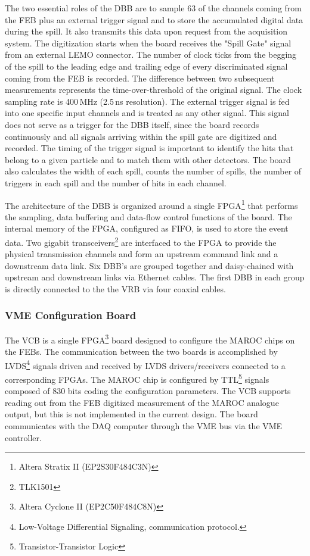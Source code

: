 \documentclass[a4paper,11pt]{article}
\begin{document}
The two essential roles of the DBB are to sample 63 of the channels coming from the FEB plus an external trigger signal and to store the accumulated
digital data during the spill. It also transmits this data upon request from the acquisition system. The digitization starts when the board
receives the "Spill Gate" signal from an external LEMO connector. The number of clock ticks from the begging of the spill to the leading edge
and trailing edge of every discriminated signal coming from the FEB is recorded. The difference between two subsequent measurements represents the time-over-threshold of the original signal. 
The clock sampling rate is 400\,MHz (2.5\,ns resolution). The external trigger signal is fed into one specific
input channels and is treated as any other signal. This signal does not serve as a trigger for the DBB itself, since the board records continuously
and all signals arriving within the spill gate are digitized and recorded. The timing of the trigger signal is important
to identify the hits that belong to a given particle and to match them with other detectors. The board also
calculates the width of each spill, counts the number of spills, the number of triggers in each spill and the number of hits in each channel.

The architecture of the DBB is organized around a single FPGA\footnote{Altera Stratix II (EP2S30F484C3N)} that performs the sampling, data
buffering and data-flow control functions of the board. The internal memory of the FPGA, configured as FIFO, is used to store the event data. Two gigabit transceivers\footnote{TLK1501}
are interfaced to the FPGA to provide the physical transmission channels and form an upstream command link and a downstream data link. Six DBB's are
grouped together and daisy-chained with upstream and downstream links via Ethernet cables. The first DBB in each group is directly connected to the
the VRB via four coaxial cables.

\subsubsection{VME Configuration Board}
The VCB is a single FPGA\footnote{Altera Cyclone II (EP2C50F484C8N)} board designed to configure the MAROC chips on the FEBs. The
communication between the two boards is accomplished by LVDS\footnote{Low-Voltage Differential Signaling, communication protocol.} signals driven and
received by LVDS drivers/receivers connected to a corresponding FPGAs. The MAROC chip is configured by TTL\footnote{Transistor-Transistor
Logic} signals composed of 830 bits coding the configuration parameters. The VCB supports reading out from the FEB digitized measurement of the
MAROC analogue output, but this is not implemented in the current design. The board communicates with the DAQ computer through the VME bus via the
VME controller. 
\end{document}
